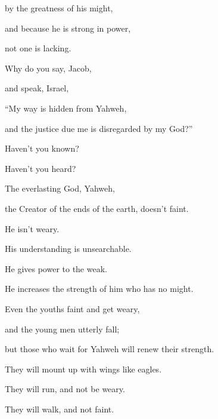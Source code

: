 {\par }{\QB by the greatness of his might,
\par }{\QB and because he is strong in power,
\par }{\QB not one is lacking.
\par }{\BB \par }{\Q {}Why do you say, Jacob,
\par }{\QB and speak, Israel,
\par }{\QB “My way is hidden from Yahweh,
\par }{\QB and the justice due me is disregarded by my God?”
\par }{\Q {}Haven’t you known?
\par }{\QB Haven’t you heard?
\par }{\QB The everlasting God, Yahweh,
\par }{\QB the Creator of the ends of the earth, doesn’t faint.
\par }{\QB He isn’t weary.
\par }{\QB His understanding is unsearchable.
\par }{\Q {}He gives power to the weak.
\par }{\QB He increases the strength of him who has no might.
\par }{\Q {}Even the youths faint and get weary,
\par }{\QB and the young men utterly fall;
\par }{\QB {}but those who wait for Yahweh will renew their strength.
\par }{\QB They will mount up with wings like eagles.
\par }{\QB They will run, and not be weary.
\par }{\QB They will walk, and not faint.

}

